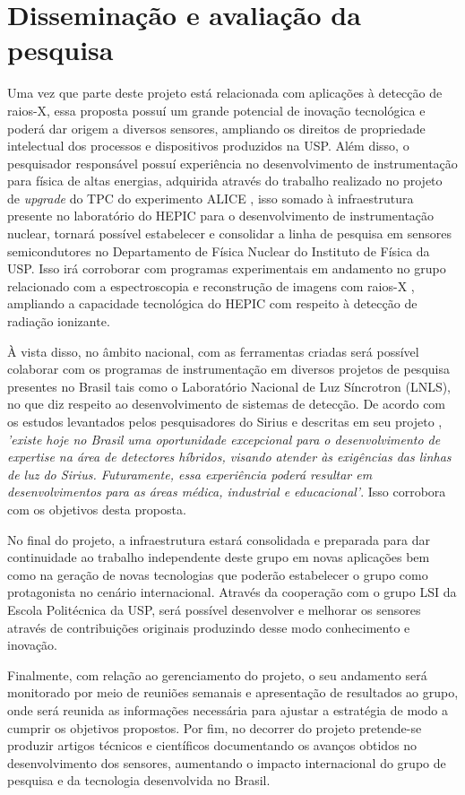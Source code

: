 \chapter{Disseminação e avaliação da pesquisa}

Uma vez que parte deste projeto está relacionada com aplicações à detecção de raios-X, essa proposta possuí um grande potencial de inovação tecnológica e poderá dar origem a diversos sensores, ampliando os direitos de propriedade intelectual dos processos e dispositivos produzidos na USP. Além disso, o pesquisador responsável possuí experiência no desenvolvimento de instrumentação para física de altas energias, adquirida através do trabalho realizado no projeto de {\it upgrade} do TPC do experimento ALICE \cite{tpcNIM}, isso somado à infraestrutura presente no laboratório do HEPIC para o desenvolvimento de instrumentação nuclear, tornará possível estabelecer e consolidar a linha de pesquisa em sensores semicondutores no Departamento de Física Nuclear do Instituto de Física da USP. Isso irá corroborar com programas experimentais em andamento no grupo relacionado com a espectroscopia e reconstrução de imagens com raios-X \cite{THGEM,NIM,xray}, ampliando a capacidade tecnológica do HEPIC com respeito à detecção de radiação ionizante. 

À vista disso, no âmbito nacional, com as ferramentas criadas será possível colaborar com os programas de instrumentação em diversos projetos de pesquisa presentes no Brasil tais como o Laboratório Nacional de Luz Síncrotron (LNLS), no que diz respeito ao desenvolvimento de sistemas de detecção. De acordo com os estudos levantados pelos pesquisadores do Sirius e descritas em seu projeto \cite{sirius}, {\it 'existe hoje no Brasil uma oportunidade excepcional para o desenvolvimento de expertise na área de detectores híbridos, visando atender às exigências das linhas de luz do Sirius. Futuramente, essa experiência poderá resultar em desenvolvimentos para as áreas médica, industrial e educacional'}. Isso corrobora com os objetivos desta proposta.

No final do projeto, a infraestrutura estará consolidada e preparada para dar continuidade ao trabalho independente deste grupo em novas aplicações bem como na geração de novas tecnologias que poderão estabelecer o grupo como protagonista no cenário internacional. Através da cooperação com o grupo LSI da Escola Politécnica da USP, será possível desenvolver e melhorar os sensores através de contribuições originais produzindo desse modo conhecimento e inovação.

Finalmente, com relação ao gerenciamento do projeto, o seu andamento será monitorado por meio de reuniões semanais e apresentação de resultados ao grupo, onde será reunida as informações necessária para ajustar a estratégia de modo a cumprir os objetivos propostos. Por fim, no decorrer do projeto pretende-se produzir artigos técnicos e científicos documentando os avanços obtidos no desenvolvimento dos sensores, aumentando o impacto internacional do grupo de pesquisa e da tecnologia desenvolvida no Brasil.
